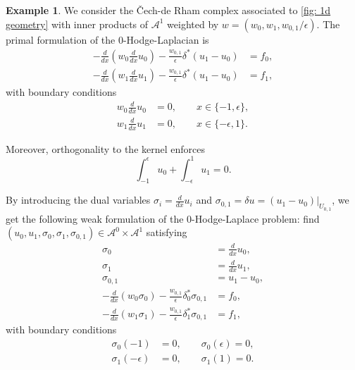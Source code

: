 \documentclass[reqno]{amsart}
\numberwithin{equation}{section}
\theoremstyle{definition}
\newtheorem{example}{Example}
\newcommand{\Ac}{\mathcal{A}}
\begin{document}
\begin{example}    
We consider the \v{C}ech-de Rham complex associated to \cref{fig: 1d geometry} with inner products of $\Ac^1$ weighted by $w = (w_0, w_1, w_{0,1}/\epsilon)$. The primal formulation of the $0$-Hodge-Laplacian is 
\begin{subequations}
\begin{align}    
-\frac{d}{dx}(w_0 \frac{d}{dx}u_0) - \frac{w_{0,1}}{\epsilon}\delta^{*}(u_1 - u_0) &= f_0, \\
-\frac{d}{dx}(w_1 \frac{d}{dx}u_1) - \frac{w_{0,1}}{\epsilon}\delta^{*}(u_1 - u_0) &= f_1,
\end{align}
\end{subequations}
with boundary conditions
\begin{subequations}
\begin{align}
w_0 \frac{d}{dx}u_0 &= 0, \qquad x \in \{-1,  \epsilon\}, \\
w_1 \frac{d}{dx}u_1 &= 0, \qquad x \in \{-\epsilon, 1\}.
\end{align}
\end{subequations}

Moreover, orthogonality to the kernel enforces 
\begin{equation}
\int_{-1}^{\epsilon} u_0 + \int_{-\epsilon}^1 u_1 = 0.
\end{equation}

By introducing the dual variables $\sigma_i = \frac{d}{dx}u_i$ and $\sigma_{0,1} = \delta u=  (u_1 - u_0)|_{U_{0,1}}$, we get the following weak formulation of the $0$-Hodge-Laplace problem: find $(u_0, u_1, \sigma_0, \sigma_1, \sigma_{0,1}) \in \Ac ^0 \times \Ac^1$ satisfying
\begin{subequations}
\begin{align} \label{eq: 1d system}
\sigma_0 &= \frac{d}{dx}u_0, \\
\sigma_1 &= \frac{d}{dx}u_1, \\
\sigma_{0,1} &= u_1 - u_0, \\
-\frac{d}{dx}(w_0 \sigma_0) - \frac{w_{0,1}}{\epsilon}\delta_0^{*} \sigma_{0,1} &= f_0, \\
-\frac{d}{dx}(w_1 \sigma_1) - \frac{w_{0,1}}{\epsilon}\delta_1^{*} \sigma_{0,1} &= f_1, 
\end{align}
\end{subequations}
with boundary conditions
\begin{subequations}
\begin{align}\label{eq: 1d boundary conditions}
\sigma_0(-1) &= 0, \qquad \sigma_0(\epsilon) = 0, \\
\sigma_1(-\epsilon) &=0, \qquad \sigma_1(1) = 0. 
\end{align}
\end{subequations}



\end{example}
\end{document}
